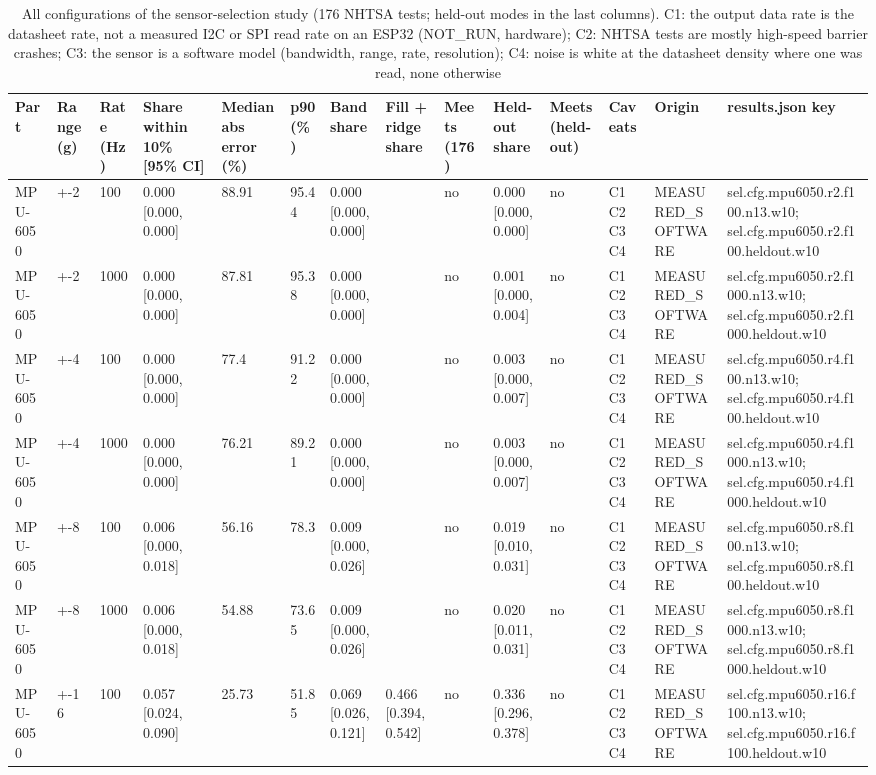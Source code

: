 \begin{table}[t]
\centering
\small
\caption{All configurations of the sensor-selection study (176 NHTSA tests; held-out modes in the last columns). C1: the output data rate is the datasheet rate, not a measured I2C or SPI read rate on an ESP32 (NOT\_RUN, hardware); C2: NHTSA tests are mostly high-speed barrier crashes; C3: the sensor is a software model (bandwidth, range, rate, resolution); C4: noise is white at the datasheet density where one was read, none otherwise}
\label{tab:tab_sel_study_all}
\begin{tabular}{llllllllllllll}
\toprule
Part & Range (g) & Rate (Hz) & Share within 10\% [95\% CI] & Median abs error (\%) & p90 (\%) & Band share & Fill + ridge share & Meets (176) & Held-out share & Meets (held-out) & Caveats & Origin & results.json key \\
\midrule
MPU-6050 & +-2 & 100 & 0.000 [0.000, 0.000] & 88.91 & 95.44 & 0.000 [0.000, 0.000] &  & no & 0.000 [0.000, 0.000] & no & C1 C2 C3 C4 & MEASURED\_SOFTWARE & sel.cfg.mpu6050.r2.f100.n13.w10; sel.cfg.mpu6050.r2.f100.heldout.w10 \\
MPU-6050 & +-2 & 1000 & 0.000 [0.000, 0.000] & 87.81 & 95.38 & 0.000 [0.000, 0.000] &  & no & 0.001 [0.000, 0.004] & no & C1 C2 C3 C4 & MEASURED\_SOFTWARE & sel.cfg.mpu6050.r2.f1000.n13.w10; sel.cfg.mpu6050.r2.f1000.heldout.w10 \\
MPU-6050 & +-4 & 100 & 0.000 [0.000, 0.000] & 77.4 & 91.22 & 0.000 [0.000, 0.000] &  & no & 0.003 [0.000, 0.007] & no & C1 C2 C3 C4 & MEASURED\_SOFTWARE & sel.cfg.mpu6050.r4.f100.n13.w10; sel.cfg.mpu6050.r4.f100.heldout.w10 \\
MPU-6050 & +-4 & 1000 & 0.000 [0.000, 0.000] & 76.21 & 89.21 & 0.000 [0.000, 0.000] &  & no & 0.003 [0.000, 0.007] & no & C1 C2 C3 C4 & MEASURED\_SOFTWARE & sel.cfg.mpu6050.r4.f1000.n13.w10; sel.cfg.mpu6050.r4.f1000.heldout.w10 \\
MPU-6050 & +-8 & 100 & 0.006 [0.000, 0.018] & 56.16 & 78.3 & 0.009 [0.000, 0.026] &  & no & 0.019 [0.010, 0.031] & no & C1 C2 C3 C4 & MEASURED\_SOFTWARE & sel.cfg.mpu6050.r8.f100.n13.w10; sel.cfg.mpu6050.r8.f100.heldout.w10 \\
MPU-6050 & +-8 & 1000 & 0.006 [0.000, 0.018] & 54.88 & 73.65 & 0.009 [0.000, 0.026] &  & no & 0.020 [0.011, 0.031] & no & C1 C2 C3 C4 & MEASURED\_SOFTWARE & sel.cfg.mpu6050.r8.f1000.n13.w10; sel.cfg.mpu6050.r8.f1000.heldout.w10 \\
MPU-6050 & +-16 & 100 & 0.057 [0.024, 0.090] & 25.73 & 51.85 & 0.069 [0.026, 0.121] & 0.466 [0.394, 0.542] & no & 0.336 [0.296, 0.378] & no & C1 C2 C3 C4 & MEASURED\_SOFTWARE & sel.cfg.mpu6050.r16.f100.n13.w10; sel.cfg.mpu6050.r16.f100.heldout.w10 \\

\end{tabular}
\end{table}
